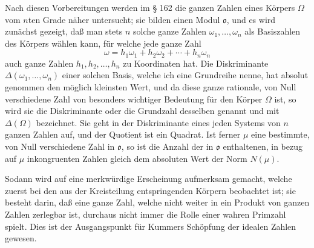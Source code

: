 \documentclass[11pt]{article}
\newcommand{\ideal}[1]{\mathfrak{#1}}
\begin{document}
Nach diesen Vorbereitungen werden im § 162 die ganzen Zahlen eines Körpers $\Omega$ vom $n$ten Grade näher untersucht; sie bilden einen Modul $\ideal{o}$, und es wird zunächst gezeigt, daß man stets $n$ solche ganze Zahlen $\omega_1,\ldots,\omega_n$ als Basiszahlen des Körpers wählen kann, für welche jede ganze Zahl
\[
\omega=h_1\omega_1+h_2\omega_2+\cdots+h_n\omega_n
\]
auch ganze Zahlen $h_1,h_2,\ldots,h_n$ zu Koordinaten hat. Die Diskriminante $\Delta(\omega_1,\ldots,\omega_n)$ einer solchen Basis, welche ich eine Grundreihe nenne, hat absolut genommen den möglich kleinsten Wert, und da diese ganze rationale, von Null verschiedene Zahl von besonders wichtiger Bedeutung für den Körper $\Omega$ ist, so wird sie die Diskriminante oder die Grundzahl desselben genannt und mit $\Delta(\Omega)$ bezeichnet. Sie geht in der Diskriminante eines jeden Systems von $n$ ganzen Zahlen auf, und der Quotient ist ein Quadrat. Ist ferner $\mu$ eine bestimmte, von Null verschiedene Zahl in $\ideal{o}$, so ist die Anzahl der in $\ideal{o}$ enthaltenen, in bezug auf $\mu$ inkongruenten Zahlen gleich dem absoluten Wert der Norm $N(\mu)$.

Sodann wird auf eine merkwürdige Erscheinung aufmerksam gemacht, welche zuerst bei den aus der Kreisteilung entspringenden Körpern beobachtet ist; sie besteht darin, daß eine ganze Zahl, welche nicht weiter in ein Produkt von ganzen Zahlen zerlegbar ist, durchaus nicht immer die Rolle einer wahren Primzahl spielt. Dies ist der Ausgangspunkt für Kummers Schöpfung der idealen Zahlen gewesen.
\end{document}
